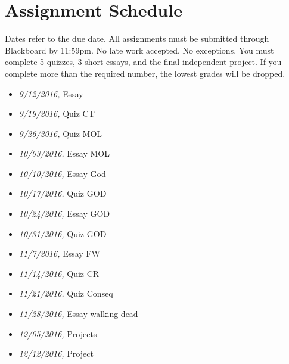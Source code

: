 \documentclass[article,oneside]{memoir}
\begin{document}
\section{ Assignment Schedule}
Dates refer to the due date. All assignments must be submitted through Blackboard by 11:59pm. No late work accepted. No exceptions. You must complete 5 quizzes, 3 short essays, and the final independent project. If you complete more than the required number, the lowest grades will be dropped.
\begin{itemize}
\item \textit{9/12/2016,} Essay 
\item \textit{9/19/2016,} Quiz CT 
\item \textit{9/26/2016,} Quiz MOL
\item \textit{10/03/2016,} Essay MOL
\item \textit{10/10/2016,} Essay God 
\item \textit{10/17/2016,} Quiz GOD
\item \textit{10/24/2016,}  Essay GOD
\item \textit{10/31/2016,} Quiz GOD
\item \textit{11/7/2016,}  Essay FW
\item \textit{11/14/2016,} Quiz CR
\item \textit{11/21/2016,} Quiz Conseq
\item \textit{11/28/2016,} Essay walking dead
\item \textit{12/05/2016,} Projects 
\item \textit{12/12/2016,} Project 
\end{itemize}




\end{document}
